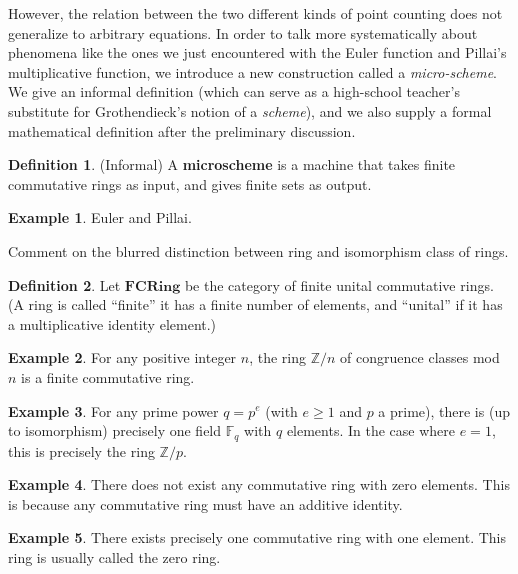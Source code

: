 \documentclass[a4paper]{article}
\theoremstyle{definition}
\newtheorem{definition}{Definition}[section]
\newtheorem{example}{Example}[section]
\theoremstyle{remark}
\newcommand{\Z}{\mathbb{Z}}
\newcommand{\defhl}[1]{\textbf{#1}}
\begin{document}
However, the relation between the two different kinds of point counting does not generalize to arbitrary equations. In order to talk more systematically about phenomena like the ones we just encountered with the Euler function and Pillai's multiplicative function, we introduce a new construction called a \emph{micro-scheme}. We give an informal definition (which can serve as a high-school teacher's substitute for Grothendieck's notion of a \emph{scheme}), and we also supply a formal mathematical definition after the preliminary discussion.

\begin{definition}
(Informal) A \defhl{microscheme} is a machine that takes finite commutative rings as input, and gives finite sets as output.
\end{definition}

\begin{example}
Euler and Pillai.
\end{example}




Comment on the blurred distinction between ring and isomorphism class of rings.

\begin{definition}
Let $\mathbf{FCRing}$ be the category of finite unital commutative rings. (A ring is called ``finite'' it has a finite number of elements, and ``unital'' if it has a multiplicative identity element.)
\end{definition}

\begin{example}
For any positive integer $n$, the ring $\Z / n$ of congruence classes mod $n$ is a finite commutative ring.
\end{example}

\begin{example}
For any prime power $q = p^e$ (with $e \geq 1$ and $p$ a prime), there is (up to isomorphism) precisely one field $\mathbb{F}_q$ with $q$ elements. In the case where $e=1$, this is precisely the ring $\Z / p$.
\end{example}

\begin{example}
There does not exist any commutative ring with zero elements. This is because any commutative ring must have an additive identity.
\end{example}

\begin{example}
There exists precisely one commutative ring with one element. This ring is usually called the zero ring.
\end{example}
\end{document}
